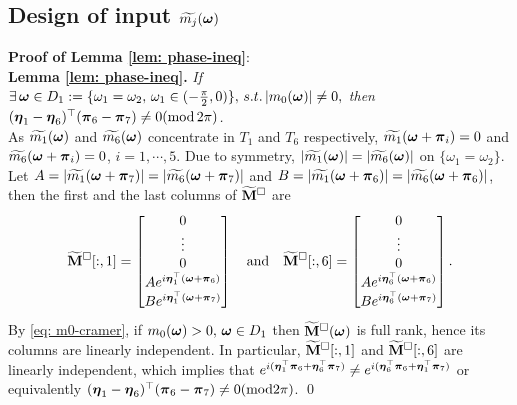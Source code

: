 \subsection{Design of input $\widetilde{m_{j}}(\boldsymbol{\omega})$}\label{app: input design}
{\bf Proof of Lemma \ref{lem: phase-ineq}}:\\[.2em]
{\bf Lemma \ref{lem: phase-ineq}.} 
{\it If $\exists\,\boldsymbol{\omega}\in D_1:=\{\omega_1=\omega_2,\,\omega_1\in(-\frac{\pi}{2},0)\},\,s.t. \,|m_0(\boldsymbol{\omega})|\neq 0,$ then $(\boldsymbol{\eta}_1-\boldsymbol{\eta}_6)^\top (\boldsymbol{\pi}_6-\boldsymbol{\pi}_7)\neq 0(\text{mod}\,2\pi)$. 
}\\ [1em]
As $\widetilde{m_{1}}(\boldsymbol{\omega})$ and $\widetilde{m_{6}}(\boldsymbol{\omega})$ concentrate in $T_1$ and $T_6$ respectively, $\widetilde{m_1}(\boldsymbol{\omega} + \boldsymbol{\pi}_i) = 0$ and  $\widetilde{m_6}(\boldsymbol{\omega} + \boldsymbol{\pi}_i) = 0$, $i = 1,\cdots, 5$. Due to symmetry, $|\widetilde{m_1}(\boldsymbol{\omega})| = |\widetilde{m_6}(\boldsymbol{\omega})|$ on $\{\omega_1=\omega_2\}$. Let $A = |\widetilde{m_1}(\boldsymbol{\omega}+\boldsymbol{\pi}_7)| = |\widetilde{m_6}(\boldsymbol{\omega}+\boldsymbol{\pi}_7)|$ and $B=|\widetilde{m_1}(\boldsymbol{\omega}+\boldsymbol{\pi}_6)| = |\widetilde{m_6}(\boldsymbol{\omega}+\boldsymbol{\pi}_6)|$, then the first and the last columns of $\widetilde{\mathbf{M}}^{\Box}$ are
  \begin{align*}
  \widetilde{\mathbf{M}}^{\Box}[:,1] = 
 \begin{bmatrix}
 0\\
 \vdots\\
 0\\
 Ae^{i\boldsymbol{\eta}_1^\top(\boldsymbol{\omega}+\boldsymbol{\pi}_6)}\\
 Be^{i\boldsymbol{\eta}_1^\top(\boldsymbol{\omega}+\boldsymbol{\pi}_7)}
 \end{bmatrix}
 \quad\text{and}\quad
  \widetilde{\mathbf{M}}^{\Box}[:,6] = 
 \begin{bmatrix}
 0\\
 \vdots\\
 0\\
 Ae^{i\boldsymbol{\eta}_6^\top(\boldsymbol{\omega}+\boldsymbol{\pi}_6)}\\
 Be^{i\boldsymbol{\eta}_6^\top(\boldsymbol{\omega}+\boldsymbol{\pi}_7)}
 \end{bmatrix} .
\end{align*}   
By \eqref{eq: m0-cramer}, if $m_0(\boldsymbol{\omega})>0, \,\boldsymbol{\omega}\in D_1$ then $\widetilde{\mathbf{M}}^{\Box}(\boldsymbol{\omega})$ is full rank, hence its columns are linearly independent.
In particular, $\widetilde{\mathbf{M}}^{\Box}[:,1]$ and $\widetilde{\mathbf{M}}^{\Box}[:,6]$ are linearly independent, which implies that $e^{i(\boldsymbol{\eta}_1^\top\boldsymbol{\pi}_6 + \boldsymbol{\eta}_6^\top\boldsymbol{\pi}_7)}\neq e^{i(\boldsymbol{\eta}_6^\top\boldsymbol{\pi}_6 + \boldsymbol{\eta}_1^\top\boldsymbol{\pi}_7)}$%
 or equivalently $(\boldsymbol{\eta}_1-\boldsymbol{\eta}_6)^\top(\boldsymbol{\pi}_6-\boldsymbol{\pi}_7)\neq 0(\text{mod}2\pi)$. \qed\\

